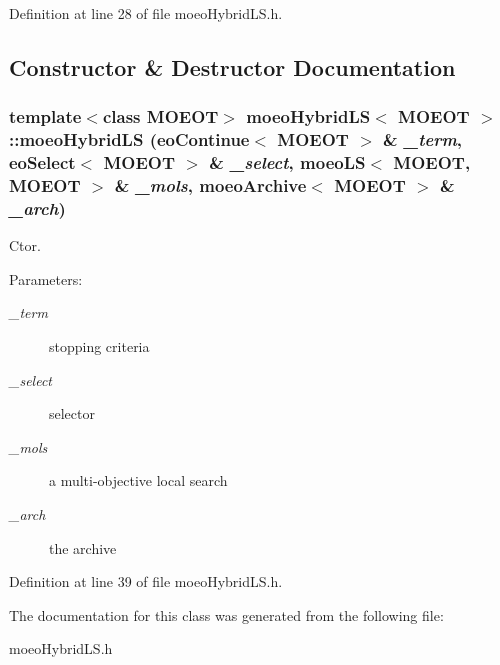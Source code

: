 Definition at line 28 of file moeo\-Hybrid\-LS.h.

\subsection{Constructor \& Destructor Documentation}
\subsubsection{\setlength{\rightskip}{0pt plus 5cm}template$<$class MOEOT$>$ {\bf moeo\-Hybrid\-LS}$<$ MOEOT $>$::{\bf moeo\-Hybrid\-LS} ({\bf eo\-Continue}$<$ MOEOT $>$ \& {\em \_\-term}, {\bf eo\-Select}$<$ MOEOT $>$ \& {\em \_\-select}, {\bf moeo\-LS}$<$ MOEOT, MOEOT $>$ \& {\em \_\-mols}, {\bf moeo\-Archive}$<$ MOEOT $>$ \& {\em \_\-arch})\hspace{0.3cm}{\tt  [inline]}}\label{classmoeoHybridLS_e669b2ca5e17467eb9819c71557aad53}


Ctor. 

\begin{Desc}
\item[Parameters:]
\begin{description}
\item[{\em \_\-term}]stopping criteria \item[{\em \_\-select}]selector \item[{\em \_\-mols}]a multi-objective local search \item[{\em \_\-arch}]the archive \end{description}
\end{Desc}


Definition at line 39 of file moeo\-Hybrid\-LS.h.

The documentation for this class was generated from the following file:\begin{CompactItemize}
\item 
moeo\-Hybrid\-LS.h\end{CompactItemize}
